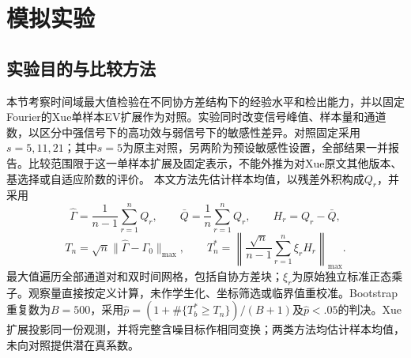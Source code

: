 \section{模拟实验}
\subsection{实验目的与比较方法}
本节考察时间域最大值检验在不同协方差结构下的经验水平和检出能力，并以固定Fourier的Xue单样本EV扩展作为对照。实验同时改变信号峰值、样本量和通道数，以区分中强信号下的高功效与弱信号下的敏感性差异。对照固定采用$s=5,11,21$；其中$s=5$为原主对照，另两阶为预设敏感性设置，全部结果一并报告。比较范围限于这一单样本扩展及固定表示，不能外推为对Xue原文其他版本、基选择或自适应阶数的评价。
本文方法先估计样本均值，以残差外积构成$Q_r$，并采用
\[
\widehat\Gamma=\frac1{n-1}\sum_{r=1}^nQ_r,\qquad
\bar Q=\frac1n\sum_{r=1}^nQ_r,\qquad H_r=Q_r-\bar Q,
\]
\[
T_n=\sqrt n\|\widehat\Gamma-\Gamma_0\|_{\max},\qquad
T_n^*=\left\|\frac{\sqrt n}{n-1}\sum_{r=1}^n\xi_rH_r\right\|_{\max}.
\]
最大值遍历全部通道对和双时间网格，包括自协方差块；$\xi_r$为原始独立标准正态乘子。观察量直接按定义计算，未作学生化、坐标筛选或临界值重校准。Bootstrap重复数为$B=500$，采用$\widehat p=(1+\#\{T_b^*\ge T_n\})/(B+1)$及$\widehat p<.05$的判决。Xue扩展投影同一份观测，并将完整含噪目标作相同变换；两类方法均估计样本均值，未向对照提供潜在真系数。
